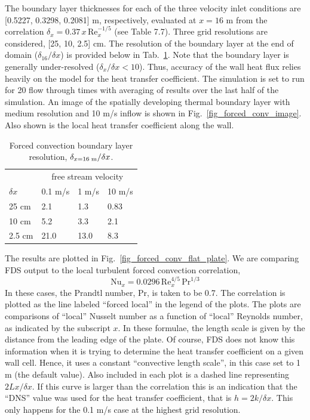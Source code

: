 \documentclass[11pt]{book}
\begin{document}
The boundary layer thicknesses for each of the three velocity inlet conditions are [0.5227, 0.3298, 0.2081] m, respectively, evaluated at $x=16$ m from the correlation $\delta_x = 0.37\,x\,\mbox{Re}_x^{-1/5}$ (see \cite{Incropera:1} Table 7.7).  Three grid resolutions are considered, [25, 10, 2.5] cm.  The resolution of the boundary layer at the end of domain ($\delta_{16}/\delta x$) is provided below in Tab.~\ref{tab:bl_resolution}. Note that the boundary layer is generally under-resolved ($\delta_x/\delta x<10$).  Thus, accuracy of the wall heat flux relies heavily on the model for the heat transfer coefficient.  The simulation is set to run for 20 flow through times with averaging of results over the last half of the simulation.  An image of the spatially developing thermal boundary layer with medium resolution and 10 m/s inflow is shown in Fig.~\ref{fig_forced_conv_image}.  Also shown is the local heat transfer coefficient along the wall.

\begin{table}[ht]
\centering
\caption[Forced convection boundary layer resolution]{Forced convection boundary layer resolution, $\delta_{x=16\;\mbox{\scriptsize m}}/\delta x$.}
\label{tab:bl_resolution}
\begin{tabular}{l|lll}
           & \multicolumn{3}{c}{free stream velocity} \\
$\delta x$ & 0.1 m/s & 1 m/s & 10 m/s \\
\hline
25 cm    & 2.1  & 1.3   & 0.83 \\
10 cm    & 5.2  & 3.3   & 2.1  \\
2.5 cm   & 21.0 & 13.0  & 8.3
\end{tabular}
\end{table}

The results are plotted in Fig.~\ref{fig_forced_conv_flat_plate}.  We are comparing FDS output to the local turbulent forced convection correlation,
\begin{equation}
\label{eq:local_forced_flat_plate_cor}
\mbox{Nu}_x = 0.0296 \, \mbox{Re}_x^{4/5} \, \mbox{Pr}^{1/3}
\end{equation}
In these cases, the Prandtl number, Pr, is taken to be 0.7.  The correlation is plotted as the line labeled ``forced local'' in the legend of the plots.  The plots are comparisons of ``local'' Nusselt number as a function of ``local'' Reynolds number, as indicated by the subscript $x$.  In these formulae, the length scale is given by the distance from the leading edge of the plate.  Of course, FDS does not know this information when it is trying to determine the heat transfer coefficient on a given wall cell.  Hence, it uses a constant ``convective length scale'', in this case set to 1 m (the default value).  Also included in each plot is a dashed line representing $2Lx/\delta x$.  If this curve is larger than the correlation this is an indication that the ``DNS'' value was used for the heat transfer coefficient, that is $h = 2k/\delta x$.  This only happens for the 0.1 m/s case at the highest grid resolution.
\end{document}
